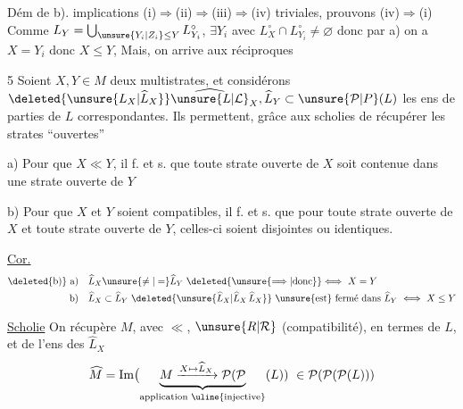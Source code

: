 Dém de b).  implications (i)$\Rightarrow$(ii)$\Rightarrow$(iii)$\Rightarrow$(iv) triviales, prouvons (iv)$\Rightarrow$(i) Comme $L_Y=\bigcup_{\unsure{Y_i|Z_i}\leq Y} L_{Y_i}^{\circ}$,  $\exists Y_i$ avec $L_X^{\circ}\cap L_{Y_i}^{\circ}\ne\varnothing$ donc par a) on a $X=Y_i$ donc $X\leq Y$, 
Mais,  on arrive aux réciproques


\uline{} 5 Soient $X,Y\in M$ deux multistrates, et considérons $\deleted{\unsure{L_X|\widehat L_X}}\widehat{\unsure{L|\mathcal{L}}}_X,\widehat L_Y\subset\unsure{\mathcal P|P}(L)$ les ens de parties de $L$ correspondantes. Ils permettent, grâce aux scholies de récupérer les strates ``ouvertes''

a) Pour que $X\ll Y$, il f. et s. que  toute strate ouverte de $X$ soit contenue dans une strate ouverte de $Y$


b) Pour que $X$ et $Y$ soient compatibles, il f. et s. que pour toute strate ouverte de $X$ et toute strate ouverte de $Y$,  celles-ci soient disjointes ou identiques.

\uline{Cor.}
\[
\begin{aligned}
\text{\deleted{b)} a)}\quad &\widehat L_X\unsure{\ne|=}\widehat L_Y\ \deleted{\unsure{\Longrightarrow|\text{donc}}}\Longleftrightarrow\ X=Y\\
\text{b)}\quad &\widehat L_X\subset\widehat L_Y\ \deleted{\unsure{\widehat L_X|\widehat L_X\,\widehat L_X}}\ \text{\unsure{est} fermé dans }\widehat L_Y\ \Longleftrightarrow\ X\leq Y
\end{aligned}
\]

\uline{Scholie} On récupère $M$, avec $\ll$, $\unsure{R|\mathcal R}$ (compatibilité), en termes de $L$, et de l'ens  des $\widehat L_X$
\[
\widehat M=\operatorname{Im}\bigl(\underbrace{M\xrightarrow{X\mapsto\widehat L_X}\mathcal P(\mathcal P}_{\text{application \uline{injective}}}(L))\ \in\mathcal P(\mathcal P(\mathcal P(L)))
\]
